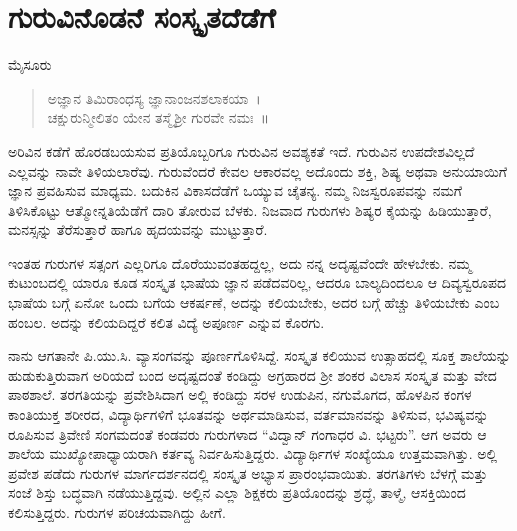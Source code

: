 \chapter{ಗುರುವಿನೊಡನೆ ಸಂಸ್ಕೃತದೆಡೆಗೆ}

\begin{center}
\smallskip

ಮೈಸೂರು
\addrule
\end{center}

\begin{verse}
ಅಜ್ಞಾನ ತಿಮಿರಾಂಧಸ್ಯ ಜ್ಞಾನಾಂಜನಶಲಾಕಯಾ~।\\
ಚಕ್ಷುರುನ್ಮೀಲಿತಂ ಯೇನ ತಸ್ಮೈಶ್ರೀ ಗುರವೇ ನಮಃ~॥
\end{verse}
ಅರಿವಿನ ಕಡೆಗೆ ಹೊರಡಬಯಸುವ ಪ್ರತಿಯೊಬ್ಬರಿಗೂ ಗುರುವಿನ ಅವಶ್ಯಕತೆ ಇದೆ. ಗುರುವಿನ ಉಪದೇಶವಿಲ್ಲದೆ ಎಲ್ಲವನ್ನು ನಾವೇ ತಿಳಿಯಲಾರೆವು. ಗುರುವೆಂದರೆ ಕೇವಲ ಆಕಾರವಲ್ಲ ಅದೊಂದು ಶಕ್ತಿ, ಶಿಷ್ಯ ಅಥವಾ ಅನುಯಾಯಿಗೆ ಜ್ಞಾನ ಪ್ರವಹಿಸುವ ಮಾಧ್ಯಮ. ಬದುಕಿನ ವಿಕಾಸದೆಡೆಗೆ ಒಯ್ಯುವ ಚೈತನ್ಯ. ನಮ್ಮ ನಿಜಸ್ವರೂಪವನ್ನು ನಮಗೆ ತಿಳಿಸಿಕೊಟ್ಟು ಆತ್ಮೋನ್ನತಿಯೆಡೆಗೆ ದಾರಿ ತೋರುವ ಬೆಳಕು. ನಿಜವಾದ ಗುರುಗಳು ಶಿಷ್ಯರ ಕೈಯನ್ನು ಹಿಡಿಯುತ್ತಾರೆ, ಮನಸ್ಸನ್ನು ತೆರೆಸುತ್ತಾರೆ ಹಾಗೂ ಹೃದಯವನ್ನು ಮುಟ್ಟುತ್ತಾರೆ.

ಇಂತಹ ಗುರುಗಳ ಸತ್ಸಂಗ ಎಲ್ಲರಿಗೂ ದೊರೆಯುವಂತಹದ್ದಲ್ಲ, ಅದು ನನ್ನ ಅದೃಷ್ಟವೆಂದೇ ಹೇಳಬೇಕು. ನಮ್ಮ ಕುಟುಂಬದಲ್ಲಿ ಯಾರೂ ಕೂಡ ಸಂಸ್ಕೃತ ಭಾಷೆಯ ಜ್ಞಾನ ಪಡೆದವರಿಲ್ಲ, ಆದರೂ ಬಾಲ್ಯದಿಂದಲೂ ಆ ದಿವ್ಯಸ್ವರೂಪದ ಭಾಷೆಯ ಬಗ್ಗೆ ಏನೋ ಒಂದು ಬಗೆಯ ಆಕರ್ಷಣೆ, ಅದನ್ನು ಕಲಿಯಬೇಕು, ಅದರ ಬಗ್ಗೆ ಹೆಚ್ಚು ತಿಳಿಯಬೇಕು ಎಂಬ ಹಂಬಲ. ಅದನ್ನು ಕಲಿಯದಿದ್ದರೆ ಕಲಿತ ವಿದ್ಯೆ ಅಪೂರ್ಣ ಎನ್ನುವ ಕೊರಗು. 

ನಾನು ಆಗತಾನೇ ಪಿ.ಯು.ಸಿ. ವ್ಯಾಸಂಗವನ್ನು ಪೂರ್ಣಗೊಳಿಸಿದ್ದೆ. ಸಂಸ್ಕೃತ ಕಲಿಯುವ ಉತ್ಸಾಹದಲ್ಲಿ ಸೂಕ್ತ ಶಾಲೆಯನ್ನು ಹುಡುಕುತ್ತಿರುವಾಗ ಅರಿಯದೆ ಬಂದ ಅದೃಷ್ಟದಂತೆ ಕಂಡಿದ್ದು ಅಗ್ರಹಾರದ ಶ್ರೀ ಶಂಕರ ವಿಲಾಸ ಸಂಸ್ಕೃತ ಮತ್ತು ವೇದ ಪಾಠಶಾಲೆ. ತರಗತಿಯನ್ನು ಪ್ರವೇಶಿಸಿದಾಗ ಅಲ್ಲಿ ಕಂಡಿದ್ದು ಸರಳ ಉಡುಪಿನ, ನಗುಮೊಗದ, ಹೊಳಪಿನ ಕಂಗಳ ಕಾಂತಿಯುಕ್ತ ಶರೀರದ, ವಿದ್ಯಾರ್ಥಿಗಳಿಗೆ ಭೂತವನ್ನು ಅರ್ಥಮಾಡಿಸುವ, ವರ್ತಮಾನವನ್ನು ತಿಳಿಸುವ, ಭವಿಷ್ಯವನ್ನು ರೂಪಿಸುವ ತ್ರಿವೇಣಿ ಸಂಗಮದಂತೆ ಕಂಡವರು ಗುರುಗಳಾದ “ವಿದ್ವಾನ್ ಗಂಗಾಧರ ವಿ. ಭಟ್ಟರು”. ಆಗ ಅವರು ಆ ಶಾಲೆಯ ಮುಖ್ಯೋಪಾಧ್ಯಾಯರಾಗಿ ಕರ್ತವ್ಯ ನಿರ್ವಹಿಸುತ್ತಿದ್ದರು. ವಿದ್ಯಾರ್ಥಿಗಳ ಸಂಖ್ಯೆಯೂ ಉತ್ತಮವಾಗಿತ್ತು. ಅಲ್ಲಿ ಪ್ರವೇಶ ಪಡೆದು ಗುರುಗಳ ಮಾರ್ಗದರ್ಶನದಲ್ಲಿ ಸಂಸ್ಕೃತ ಅಭ್ಯಾಸ ಪ್ರಾರಂಭವಾಯಿತು. ತರಗತಿಗಳು ಬೆಳಗ್ಗೆ ಮತ್ತು ಸಂಜೆ ಶಿಸ್ತು ಬದ್ಧವಾಗಿ ನಡೆಯುತ್ತಿದ್ದವು. ಅಲ್ಲಿನ ಎಲ್ಲಾ ಶಿಕ್ಷಕರು ಪ್ರತಿಯೊಂದನ್ನು ಶ್ರದ್ಧೆ, ತಾಳ್ಮೆ, ಆಸಕ್ತಿಯಿಂದ ಕಲಿಸುತ್ತಿದ್ದರು. ಗುರುಗಳ ಪರಿಚಯವಾಗಿದ್ದು ಹೀಗೆ.

